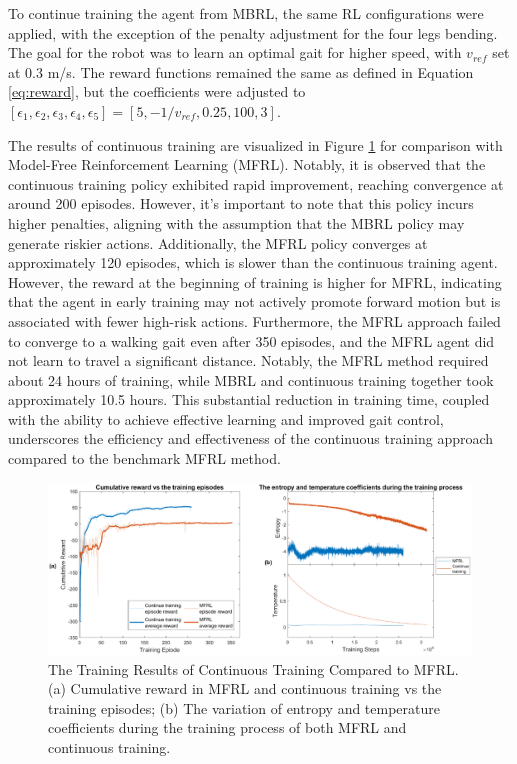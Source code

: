 To continue training the agent from MBRL, the same RL configurations were applied, with the exception of the penalty adjustment for the four legs bending. The goal for the robot was to learn an optimal gait for higher speed, with $v_{ref}$ set at 0.3 m/s. The reward functions remained the same as defined in Equation \ref{eq:reward}, but the coefficients were adjusted to $[\epsilon_1, \epsilon_2, \epsilon_3, \epsilon_4, \epsilon_5] = [5, −1/v_{ref}, 0.25, 100, 3]$. 

The results of continuous training are visualized in Figure \ref{fig:MFRLvsCT} for comparison with Model-Free Reinforcement Learning (MFRL). Notably, it is observed that the continuous training policy exhibited rapid improvement, reaching convergence at around 200 episodes. However, it's important to note that this policy incurs higher penalties, aligning with the assumption that the MBRL policy may generate riskier actions. Additionally, the MFRL policy converges at approximately 120 episodes, which is slower than the continuous training agent. However, the reward at the beginning of training is higher for MFRL, indicating that the agent in early training may not actively promote forward motion but is associated with fewer high-risk actions. Furthermore, the MFRL approach failed to converge to a walking gait even after 350 episodes, and the MFRL agent did not learn to travel a significant distance. Notably, the MFRL method required about 24 hours of training, while MBRL and continuous training together took approximately 10.5 hours. This substantial reduction in training time, coupled with the ability to achieve effective learning and improved gait control, underscores the efficiency and effectiveness of the continuous training approach compared to the benchmark MFRL method.
\begin{figure}[htb]
    \centering
    \includegraphics[width=\linewidth]{img/chap5/MFRLvsCT.eps}
    \caption{The Training Results of Continuous Training Compared to MFRL. (a) Cumulative reward in MFRL and continuous training vs the training episodes; (b) The variation of entropy and temperature coefficients during the training process of both MFRL and continuous training.}
    \label{fig:MFRLvsCT}
\end{figure}

